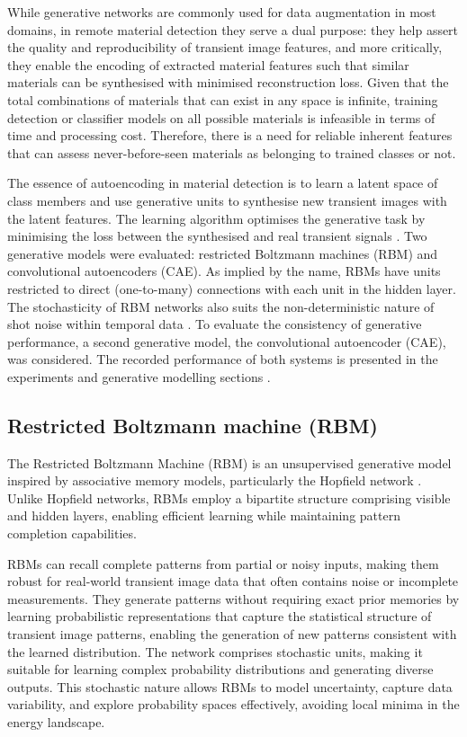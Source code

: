 \documentclass[12pt,a4paper,oneside]{report}
\begin{document}
While generative networks are commonly used for data augmentation in most domains, in remote material detection they serve a dual purpose: they help assert the quality and reproducibility of transient image features, and more critically, they enable the encoding of extracted material features such that similar materials can be synthesised with minimised reconstruction loss. Given that the total combinations of materials that can exist in any space is infinite, training detection or classifier models on all possible materials is infeasible in terms of time and processing cost. Therefore, there is a need for reliable inherent features that can assess never-before-seen materials as belonging to trained classes or not.

The essence of autoencoding in material detection is to learn a latent space of class members and use generative units to synthesise new transient images with the latent features. The learning algorithm optimises the generative task by minimising the loss between the synthesised and real transient signals \cite{ackley1985}. Two generative models were evaluated: restricted Boltzmann machines (RBM) and convolutional autoencoders (CAE). As implied by the name, RBMs have units restricted to direct (one-to-many) connections with each unit in the hidden layer. The stochasticity of RBM networks also suits the non-deterministic nature of shot noise within temporal data \cite{tontini2020}. To evaluate the consistency of generative performance, a second generative model, the convolutional autoencoder (CAE), was considered. The recorded performance of both systems is presented in the experiments and generative modelling sections \cite{su2016,jungerman2022}.


\subsection{Restricted Boltzmann machine (RBM)}
\label{subsec:rbm}

The Restricted Boltzmann Machine (RBM) is an unsupervised generative model inspired by associative memory models, particularly the Hopfield network \cite{hopfield1982}. Unlike Hopfield networks, RBMs employ a bipartite structure comprising visible and hidden layers, enabling efficient learning while maintaining pattern completion capabilities.

RBMs can recall complete patterns from partial or noisy inputs, making them robust for real-world transient image data that often contains noise or incomplete measurements. They generate patterns without requiring exact prior memories by learning probabilistic representations that capture the statistical structure of transient image patterns, enabling the generation of new patterns consistent with the learned distribution. The network comprises stochastic units, making it suitable for learning complex probability distributions and generating diverse outputs. This stochastic nature allows RBMs to model uncertainty, capture data variability, and explore probability spaces effectively, avoiding local minima in the energy landscape.
\end{document}
